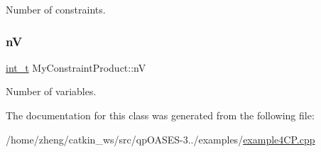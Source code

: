 Number of constraints. \mbox{\label{class_my_constraint_product_a65e340b03049602db9ba4bb29bf1149c}} 
\subsubsection{\texorpdfstring{nV}{nV}}
{\footnotesize\ttfamily \hyperlink{_types_8hpp_ab6fd6105e64ed14a0c9281326f05e623}{int\+\_\+t} My\+Constraint\+Product\+::nV\hspace{0.3cm}{\ttfamily [protected]}}

Number of variables. 

The documentation for this class was generated from the following file\+:\begin{DoxyCompactItemize}
\item 
/home/zheng/catkin\+\_\+ws/src/qp\+O\+A\+S\+E\+S-\/3../examples/\hyperlink{example4_c_p_8cpp}{example4\+C\+P.\+cpp}\end{DoxyCompactItemize}
